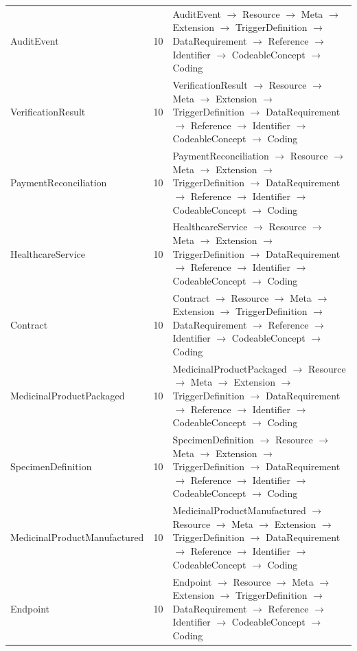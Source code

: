 \begin{longtable}{lrl}
AuditEvent & 10 & AuditEvent $\rightarrow$ Resource $\rightarrow$ Meta $\rightarrow$ Extension $\rightarrow$ TriggerDefinition $\rightarrow$ DataRequirement $\rightarrow$ Reference $\rightarrow$ Identifier $\rightarrow$ CodeableConcept $\rightarrow$ Coding \\
VerificationResult & 10 & VerificationResult $\rightarrow$ Resource $\rightarrow$ Meta $\rightarrow$ Extension $\rightarrow$ TriggerDefinition $\rightarrow$ DataRequirement $\rightarrow$ Reference $\rightarrow$ Identifier $\rightarrow$ CodeableConcept $\rightarrow$ Coding \\
PaymentReconciliation & 10 & PaymentReconciliation $\rightarrow$ Resource $\rightarrow$ Meta $\rightarrow$ Extension $\rightarrow$ TriggerDefinition $\rightarrow$ DataRequirement $\rightarrow$ Reference $\rightarrow$ Identifier $\rightarrow$ CodeableConcept $\rightarrow$ Coding \\
HealthcareService & 10 & HealthcareService $\rightarrow$ Resource $\rightarrow$ Meta $\rightarrow$ Extension $\rightarrow$ TriggerDefinition $\rightarrow$ DataRequirement $\rightarrow$ Reference $\rightarrow$ Identifier $\rightarrow$ CodeableConcept $\rightarrow$ Coding \\
Contract & 10 & Contract $\rightarrow$ Resource $\rightarrow$ Meta $\rightarrow$ Extension $\rightarrow$ TriggerDefinition $\rightarrow$ DataRequirement $\rightarrow$ Reference $\rightarrow$ Identifier $\rightarrow$ CodeableConcept $\rightarrow$ Coding \\
MedicinalProductPackaged & 10 & MedicinalProductPackaged $\rightarrow$ Resource $\rightarrow$ Meta $\rightarrow$ Extension $\rightarrow$ TriggerDefinition $\rightarrow$ DataRequirement $\rightarrow$ Reference $\rightarrow$ Identifier $\rightarrow$ CodeableConcept $\rightarrow$ Coding \\
SpecimenDefinition & 10 & SpecimenDefinition $\rightarrow$ Resource $\rightarrow$ Meta $\rightarrow$ Extension $\rightarrow$ TriggerDefinition $\rightarrow$ DataRequirement $\rightarrow$ Reference $\rightarrow$ Identifier $\rightarrow$ CodeableConcept $\rightarrow$ Coding \\
MedicinalProductManufactured & 10 & MedicinalProductManufactured $\rightarrow$ Resource $\rightarrow$ Meta $\rightarrow$ Extension $\rightarrow$ TriggerDefinition $\rightarrow$ DataRequirement $\rightarrow$ Reference $\rightarrow$ Identifier $\rightarrow$ CodeableConcept $\rightarrow$ Coding \\
Endpoint & 10 & Endpoint $\rightarrow$ Resource $\rightarrow$ Meta $\rightarrow$ Extension $\rightarrow$ TriggerDefinition $\rightarrow$ DataRequirement $\rightarrow$ Reference $\rightarrow$ Identifier $\rightarrow$ CodeableConcept $\rightarrow$ Coding \\

\end{longtable}
